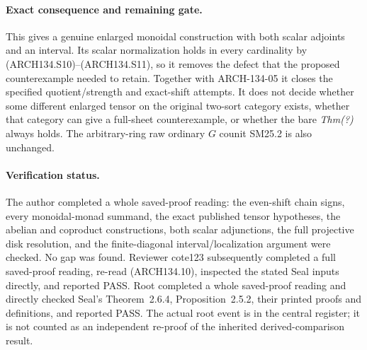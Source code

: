 \paragraph{Exact consequence and remaining gate.}
This gives a genuine enlarged monoidal construction with both
scalar adjoints and an interval.  Its scalar normalization
holds in every cardinality by (ARCH134.S10)--(ARCH134.S11),
so it removes the defect that the proposed counterexample
needed to retain.  Together with ARCH-134-05 it closes the
specified quotient/strength and exact-shift attempts.  It
does not decide whether some different enlarged tensor on
the original two-sort category exists, whether that category
can give a full-sheet counterexample, or whether the bare
\emph{Thm(?)} always holds.  The arbitrary-ring raw ordinary
$G$ counit SM25.2 is also unchanged.

\paragraph{Verification status.}
The author completed a whole saved-proof reading: the even-shift
chain signs, every monoidal-monad summand, the exact published
tensor hypotheses, the abelian and coproduct constructions, both
scalar adjunctions, the full projective disk resolution, and the
finite-diagonal interval/localization argument were checked.  No
gap was found.  Reviewer cote123 subsequently completed a full
saved-proof reading, re-read (ARCH134.10), inspected the stated
Seal inputs directly, and reported PASS.  Root completed a whole
saved-proof reading and directly checked Seal's Theorem~2.6.4,
Proposition~2.5.2, their printed proofs and definitions, and
reported PASS.  The actual root event is in the central register;
it is not counted as an independent re-proof of the inherited
derived-comparison result.
